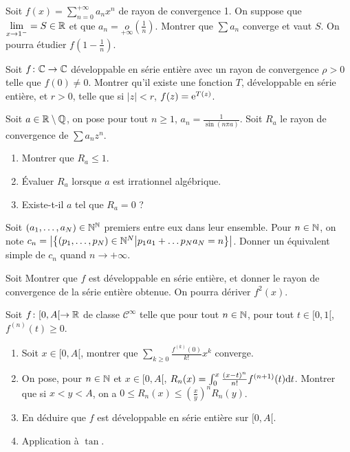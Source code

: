 \documentclass[12pt]{article}
\begin{document}
\begin{exercise}
    Soit $f(x)=\sum_{n=0}^{+\infty}a_nx^{n}$ de rayon de convergence 1. On suppose que $\lim\limits_{x\to1^{-}}=S\in\mathbb{R}$ et que $a_n=\underset{+\infty}{o}\left(\frac{1}{n}\right)$. Montrer que $\sum a_{n}$ converge et vaut $S$. On pourra étudier $f\left(1-\frac{1}{n}\right)$.
\end{exercise}

\begin{exercise}
    Soit $f\colon\mathbb{C}\to\mathbb{C}$ développable en série entière avec un rayon de convergence $\rho>0$ telle que $f(0)\neq0$. Montrer qu'il existe une fonction $T$, développable en série entière, et $r>0$, telle que si $\left\lvert z\right\rvert<r$, $f(z)=\mathrm{e}^{T(z)}$.
\end{exercise}

\begin{exercise}
    Soit $a\in\mathbb{R}\setminus\mathbb{Q}$, on pose pour tout $n\geqslant1$, $a_n=\frac{1}{\sin(n\pi a)}$. Soit $R_a$ le rayon de convergence de $\sum a_{n}z^{n}$.
    \begin{enumerate}
        \item Montrer que $R_a\leqslant1$.
        \item Évaluer $R_a$ lorsque $a$ est irrationnel algébrique.
        \item Existe-t-il $a$ tel que $R_a=0$ ?
    \end{enumerate}
\end{exercise}

\begin{exercise}
    Soit $(a_{1},\dots,a_{N})\in\mathbb{N}^{\mathbb{N}}$ premiers entre eux dans leur ensemble. Pour $n\in\mathbb{N}$, on note $c_n=\left\lvert\left\lbrace (p_1,\dots,p_N)\in\mathbb{N}^{N}\middle| p_1a_1+\dots p_Na_N=n\right\rbrace\right\rvert$. Donner un équivalent simple de $c_n$ quand $n\to+\infty$.
\end{exercise}

\begin{exercise}
    Soit 
    Montrer que $f$ est développable en série entière, et donner le rayon de convergence de la série entière obtenue. On pourra dériver $f^{2}(x)$.
\end{exercise}

\begin{exercise}
    Soit $f\colon[0,A[\to\mathbb{R}$ de classe $\mathcal{C}^{\infty}$ telle que pour tout $n\in\mathbb{N}$, pour tout $t\in[0,1[$, $f^{(n)}(t)\geqslant0$.
    \begin{enumerate}
        \item Soit $x\in[0,A[$, montrer que $\sum_{k\geqslant0}\frac{f^{(k)}(0)}{k!}x^{k}$ converge.
        \item On pose, pour $n\in\mathbb{N}$ et $x\in[0,A[$, $R_n(x)=\int_{0}^{x}\frac{(x-t)^{n}}{n!}f^{(n+1)}(t)\mathrm{d} t$. Montrer que si $x<y<A$, on a $0\leqslant R_n(x)\leqslant\left(\frac{x}{y}\right)^{n}R_n(y)$.
        \item En déduire que $f$ est développable en série entière sur $[0,A[$.
        \item Application à $\tan$.
    \end{enumerate}
\end{exercise}
\end{document}
